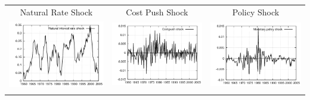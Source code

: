 \documentclass{beamer}
\begin{document}
{\begin{center}
\begin{tabular}{ccc}
  \small{Natural Rate Shock} & \small{Cost Push Shock} & \small{Policy Shock} \\
  \includegraphics[scale=0.23]{plots2/initest_natint.png} & \includegraphics[scale=0.23]{plots2/initest_costpush.png} & \includegraphics[scale=0.23]{plots2/initest_mpshock.png} \\ \\
  \end{tabular}
  \end{center}
}
\end{document}
